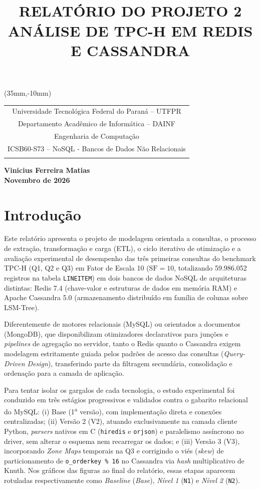 \documentclass[12pt,a4paper]{article}
\title{\textbf{\normalsize \\[5cm]
RELATÓRIO DO PROJETO 2 \\ ANÁLISE DE TPC-H EM REDIS E CASSANDRA}}
\author{}
\date{}
\begin{document}
\thisfancyput(35mm,-10mm){
\begin{tabular}{c}
Universidade Tecnológica Federal do Paraná -- \small{UTFPR}\\
Departamento Acadêmico de Informática -- \small{DAINF}\\
Engenharia de Computação \\
ICSB60-S73 -- NoSQL - Bancos de Dados Não Relacionais \\
\\
\end{tabular}}

\maketitle
\begin{center}
\vspace{4.5cm}
\textbf{Vinicius Ferreira Matias} \\[4.5cm]
\textbf{Novembro de 2026}
\end{center}

\newpage

\section*{Introdução}
Este relatório apresenta o projeto de modelagem orientada a consultas, o processo de extração, transformação e carga (ETL), o ciclo iterativo de otimização e a avaliação experimental de desempenho das três primeiras consultas do benchmark TPC-H (Q1, Q2 e Q3) em Fator de Escala 10 ($\text{SF} = 10$, totalizando 59.986.052 registros na tabela \texttt{LINEITEM}) em dois bancos de dados NoSQL de arquiteturas distintas: Redis 7.4 (chave-valor e estruturas de dados em memória RAM) e Apache Cassandra 5.0 (armazenamento distribuído em família de colunas sobre LSM-Tree).

Diferentemente de motores relacionais (MySQL) ou orientados a documentos (MongoDB), que disponibilizam otimizadores declarativos para junções e \textit{pipelines} de agregação no servidor, tanto o Redis quanto o Cassandra exigem modelagem estritamente guiada pelos padrões de acesso das consultas (\textit{Query-Driven Design}), transferindo parte da filtragem secundária, consolidação e ordenação para a camada de aplicação.

Para tentar isolar os gargalos de cada tecnologia, o estudo experimental foi conduzido em três estágios progressivos e validados contra o gabarito relacional do MySQL: (i) Base (1\textsuperscript{a} versão), com implementação direta e conexões centralizadas; (ii) Versão 2 (V2), atuando exclusivamente na camada cliente Python, \textit{parsers} nativos em C (\texttt{hiredis} e \texttt{orjson}) e paralelismo assíncrono no driver, sem alterar o esquema nem recarregar os dados; e (iii) Versão 3 (V3), incorporando \textit{Zone Maps} temporais na Q3 e corrigindo o viés (\textit{skew}) de particionamento de \texttt{o\_orderkey \% 16} no Cassandra via \textit{hash} multiplicativo de Knuth. Nos gráficos das figuras ao final do relatório, essas etapas aparecem rotuladas respectivamente como \textit{Baseline} (\textit{Base}), \textit{Nível 1} (\texttt{N1}) e \textit{Nível 2} (\texttt{N2}).
\end{document}
